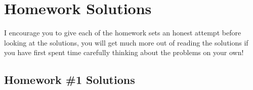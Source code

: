 \renewcommand{\thechapter}{HS}
\chapter*{Homework Solutions}
\addtocounter{chapter}{1} %
\setcounter{section}{0}
\vspace{-0.3in}
\begin{tcolorbox}
    I encourage you to give each of the homework sets an honest attempt before looking at the solutions, you will get much more out of reading the solutions if you have first spent time carefully thinking about the problems on your own!
\end{tcolorbox}
\vspace{-0.2in}
\section{Homework \#1 Solutions}

